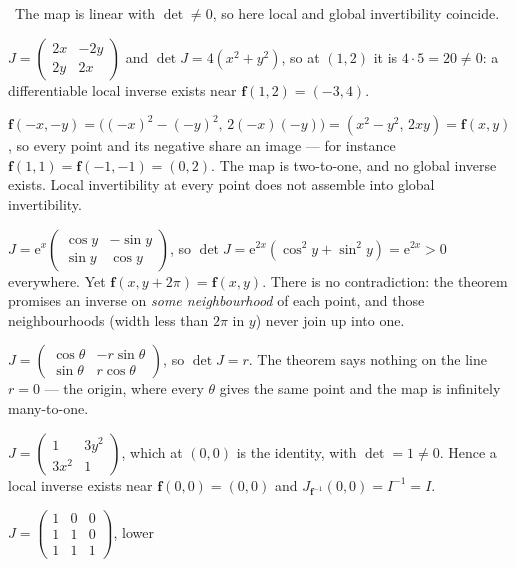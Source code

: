 \begin{solutions}
        \checkmark\ The map is linear with $\det\neq0$, so here local and
        global invertibility coincide.
  \item $J=\begin{pmatrix}2x&-2y\\2y&2x\end{pmatrix}$ and
        $\det J=4(x^{2}+y^{2})$, so at $(1,2)$ it is $4\cdot5=20\neq0$: a
        differentiable local inverse exists near
        $\mathbf{f}(1,2)=(-3,4)$.
  \item $\mathbf{f}(-x,-y)=\bigl((-x)^{2}-(-y)^{2},\,2(-x)(-y)\bigr)
        =(x^{2}-y^{2},\,2xy)=\mathbf{f}(x,y)$, so every point and its
        negative share an image --- for instance
        $\mathbf{f}(1,1)=\mathbf{f}(-1,-1)=(0,2)$. The map is two-to-one,
        and no global inverse exists. Local invertibility at every point
        does not assemble into global invertibility.
  \item $J=\mathrm{e}^{x}\begin{pmatrix}\cos y&-\sin y\\
        \sin y&\cos y\end{pmatrix}$, so
        $\det J=\mathrm{e}^{2x}(\cos^{2}y+\sin^{2}y)=\mathrm{e}^{2x}>0$
        everywhere. Yet $\mathbf{f}(x,y+2\pi)=\mathbf{f}(x,y)$. There is no
        contradiction: the theorem promises an inverse on \emph{some
        neighbourhood} of each point, and those neighbourhoods (width less
        than $2\pi$ in $y$) never join up into one.
  \item $J=\begin{pmatrix}\cos\theta&-r\sin\theta\\
        \sin\theta&r\cos\theta\end{pmatrix}$, so $\det J=r$. The theorem
        says nothing on the line $r=0$ --- the origin, where every $\theta$
        gives the same point and the map is infinitely many-to-one.
  \item $J=\begin{pmatrix}1&3y^{2}\\3x^{2}&1\end{pmatrix}$, which at
        $(0,0)$ is the identity, with $\det=1\neq0$. Hence a local inverse
        exists near $\mathbf{f}(0,0)=(0,0)$ and
        $J_{\mathbf{f}^{-1}}(0,0)=I^{-1}=I$.
  \item $J=\begin{pmatrix}1&0&0\\1&1&0\\1&1&1\end{pmatrix}$, lower

\end{solutions}
